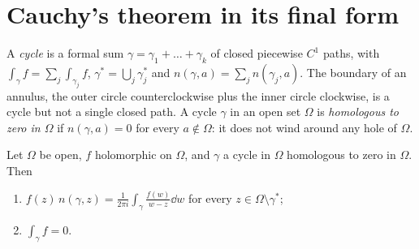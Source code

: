 \section{Cauchy's theorem in its final form}

A \emph{cycle} is a formal sum $\gamma=\gamma_1+\dots+\gamma_k$ of closed piecewise $C^1$ paths, with $\int_\gamma f=\sum_j\int_{\gamma_j}f$, $\gamma^*=\bigcup_j\gamma_j^*$ and $n(\gamma,a)=\sum_jn(\gamma_j,a)$. The boundary of
an annulus, the outer circle counterclockwise plus the inner circle clockwise, is a cycle but not a single closed path. A cycle $\gamma$ in an open set $\Omega$ is \emph{homologous to zero in $\Omega$} if
$n(\gamma,a)=0$ for every $a\notin\Omega$: it does not wind around any hole of $\Omega$.

\begin{theorem}\label{thm:globalcauchy}
Let $\Omega$ be open, $f$ holomorphic on $\Omega$, and $\gamma$ a cycle in $\Omega$ homologous to zero in $\Omega$. Then
\begin{enumerate}
\item[(a)] $\displaystyle f(z)\,n(\gamma,z)=\frac1{2\pi i}\int_\gamma\frac{f(w)}{w-z}\dd w$ for every $z\in\Omega\setminus\gamma^*$;
\item[(b)] $\displaystyle\int_\gamma f=0$.
\end{enumerate}
\end{theorem}
